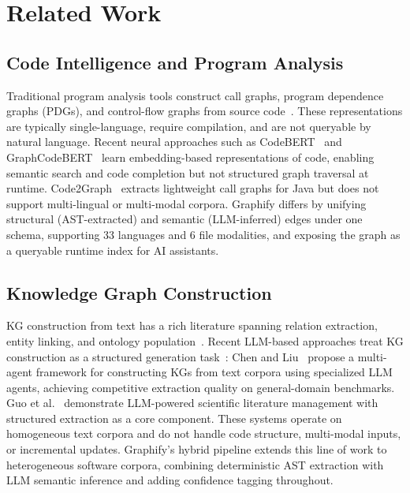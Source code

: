 \section{Related Work}
\label{sec:related}

\subsection{Code Intelligence and Program Analysis}

Traditional program analysis tools construct call graphs, program dependence
graphs (PDGs), and control-flow graphs from source code~\cite{allen1970control}.
These representations are typically single-language, require compilation, and
are not queryable by natural language. Recent neural approaches such as
CodeBERT~\cite{feng2020codebert} and GraphCodeBERT~\cite{guo2021graphcodebert}
learn embedding-based representations of code, enabling semantic search and
code completion but not structured graph traversal at runtime.
Code2Graph~\cite{code2graph} extracts lightweight call graphs for Java but
does not support multi-lingual or multi-modal corpora.
Graphify differs by unifying structural (AST-extracted) and semantic
(LLM-inferred) edges under one schema, supporting 33 languages and 6 file
modalities, and exposing the graph as a queryable runtime index for AI assistants.

\subsection{Knowledge Graph Construction}

KG construction from text has a rich literature spanning relation extraction,
entity linking, and ontology population~\cite{weikum2010information}.
Recent LLM-based approaches treat KG construction as a structured generation
task~\cite{chen2024multiagent}: Chen and Liu~\cite{chen2024multiagent} propose a
multi-agent framework for constructing KGs from text corpora using specialized
LLM agents, achieving competitive extraction quality on general-domain benchmarks.
Guo et al.~\cite{guo2024slmp} demonstrate LLM-powered scientific literature
management with structured extraction as a core component.
These systems operate on homogeneous text corpora and do not handle code
structure, multi-modal inputs, or incremental updates. Graphify's hybrid
pipeline extends this line of work to heterogeneous software corpora, combining
deterministic AST extraction with LLM semantic inference and adding confidence
tagging throughout.

